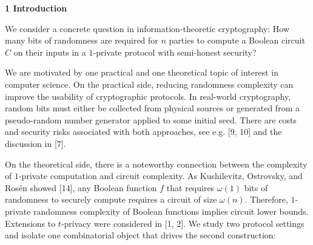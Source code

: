 

\par\medskip\noindent\textbf{
1 Introduction}\par




We consider a concrete question in information-theoretic cryptography: How many bits of randomness are required for $n$ parties to compute a Boolean circuit $C$ on their inputs in a $1$-private protocol with semi-honest security?\par




We are motivated by one practical and one theoretical topic of interest in computer science. On the practical side, reducing randomness complexity can improve the usability of cryptographic protocols. In real-world cryptography, random bits must either be collected from physical sources or generated from a pseudo-random number generator applied to some initial seed. There are costs and security risks associated with both approaches, see e.g. [9, 10] and the discussion in [7].\par




On the theoretical side, there is a noteworthy connection between the complexity of $1$-private computation and circuit complexity. As Kushilevitz, Ostrovsky, and Rosén showed [14], any Boolean function $f$ that requires $\omega(1)$ bits of randomness to securely compute requires a circuit of size $\omega(n)$. Therefore, $1$-private randomness complexity of Boolean functions implies circuit lower bounds. Extensions to $t$-privacy were considered in [1, 2].
We study two protocol settings and isolate one combinatorial object that drives the second construction:\par




